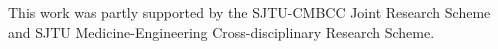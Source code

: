 \documentclass[sigconf]{acmart}
\begin{document}

\maketitle








\begin{acks}
This work was partly supported by the
SJTU-CMBCC Joint Research Scheme and SJTU Medicine-Engineering
Cross-disciplinary Research Scheme.
\end{acks}




\appendix


\end{document}
